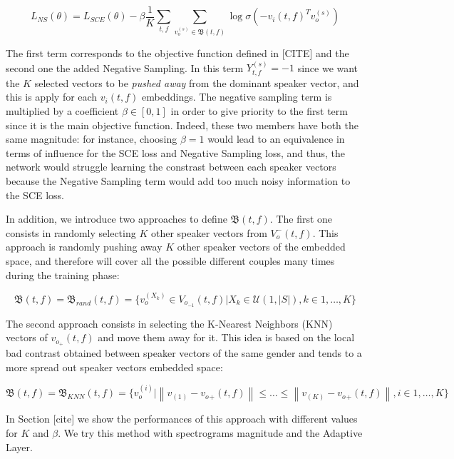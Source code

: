 \documentclass[master, tikz, final,11pt, dvipdfmx]{iscs-thesis}
\newcommand{\norm}[1]{\left\lVert#1\right\rVert}
\begin{document}

\[L_{NS}(\theta) = L_{SCE}(\theta) - \beta \frac{1}{K} \sum_{t,f} \sum_{v_o^{(s)} \in \mathfrak{B}(t,f)} \log \sigma(- v_i(t,f)^{T} v_o^{(s)}) \]

The first term corresponds to the objective function defined in [CITE] and the second one the added Negative Sampling. In this term $Y_{t,f}^{(s)} = -1$ since we want the $K$ selected vectors to be \textit{pushed away} from the dominant speaker vector, and this is apply for each $v_i(t,f)$ embeddings. The negative sampling term is multiplied by a coefficient $\beta \in[0,1]$ in order to give priority to the first term since it is the main objective function. Indeed, these two members have both the same magnitude: for instance, choosing $\beta = 1$ would lead to an equivalence in terms of influence for the SCE loss and Negative Sampling loss, and thus, the network would struggle learning the constrast between each speaker vectors because the Negative Sampling term would add too much noisy information to the SCE loss. 

In addition, we introduce two approaches to define $\mathfrak{B}(t,f)$. The first one consists in randomly selecting $K$ other speaker vectors from $V_o^-(t,f)$. This approach is randomly pushing away $K$ other speaker vectors of the embedded space, and therefore will cover all the possible different couples many times during the training phase:

\[\mathfrak{B}(t,f) = \mathfrak{B}_{rand}(t,f) = \{v_o^{(X_k)} \in V_{o_{-1}}(t,f) | X_k \in \mathcal{U}(1,|S|), k \in 1, \dotsc,K\} \]

The second approach consists in selecting the K-Nearest Neighbors (KNN) vectors of $v_{o_{+}}(t,f)$ and move them away for it. This idea is based on the local bad contrast obtained between speaker vectors of the same gender and tends to a more spread out speaker vectors embedded space:


\[\mathfrak{B}(t,f) = \mathfrak{B}_{KNN}(t,f) = \{v_o^{(i)} | \norm{v_{{(1)}}-v_o{_{+}}(t,f)} \leq \dots \leq \norm{v_{{(K)}}-v_o{_{+}}(t,f)}, i \in 1, \dotsc,K\}\]

In Section [cite] we show the performances of this approach with different values for $K$ and $\beta$. We try this method with spectrograms magnitude and the Adaptive Layer.
\end{document}
